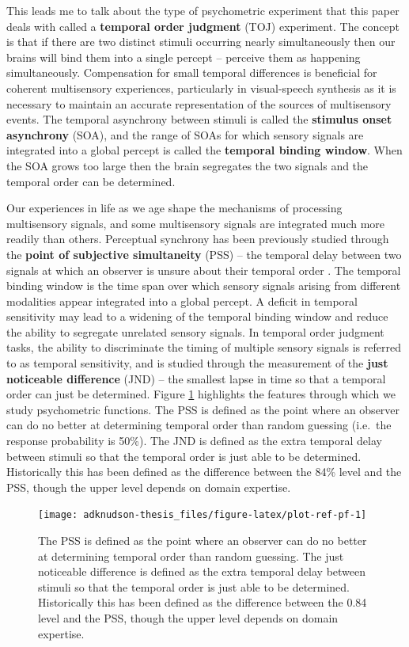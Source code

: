 \documentclass[
]{report}
\begin{document}
This leads me to talk about the type of psychometric experiment that this paper deals with called a \textbf{temporal order judgment} (TOJ) experiment. The concept is that if there are two distinct stimuli occurring nearly simultaneously then our brains will bind them into a single percept -- perceive them as happening simultaneously. Compensation for small temporal differences is beneficial for coherent multisensory experiences, particularly in visual-speech synthesis as it is necessary to maintain an accurate representation of the sources of multisensory events. The temporal asynchrony between stimuli is called the \textbf{stimulus onset asynchrony} (SOA), and the range of SOAs for which sensory signals are integrated into a global percept is called the \textbf{temporal binding window}. When the SOA grows too large then the brain segregates the two signals and the temporal order can be determined.

Our experiences in life as we age shape the mechanisms of processing multisensory signals, and some multisensory signals are integrated much more readily than others. Perceptual synchrony has been previously studied through the \textbf{point of subjective simultaneity} (PSS) -- the temporal delay between two signals at which an observer is unsure about their temporal order \citep{stone2001now}. The temporal binding window is the time span over which sensory signals arising from different modalities appear integrated into a global percept. A deficit in temporal sensitivity may lead to a widening of the temporal binding window and reduce the ability to segregate unrelated sensory signals. In temporal order judgment tasks, the ability to discriminate the timing of multiple sensory signals is referred to as temporal sensitivity, and is studied through the measurement of the \textbf{just noticeable difference} (JND) -- the smallest lapse in time so that a temporal order can just be determined. Figure \ref{fig:plot-ref-pf} highlights the features through which we study psychometric functions. The PSS is defined as the point where an observer can do no better at determining temporal order than random guessing (i.e.~the response probability is 50\%). The JND is defined as the extra temporal delay between stimuli so that the temporal order is just able to be determined. Historically this has been defined as the difference between the 84\% level and the PSS, though the upper level depends on domain expertise.

\begin{figure}

{\centering \texttt{[image: adknudson-thesis\_files/figure-latex/plot-ref-pf-1]} 

}

\caption{The PSS is defined as the point where an observer can do no better at determining temporal order than random guessing. The just noticeable difference is defined as the extra temporal delay between stimuli so that the temporal order is just able to be determined. Historically this has been defined as the difference between the 0.84 level and the PSS, though the upper level depends on domain expertise.}\label{fig:plot-ref-pf}
\end{figure}
\end{document}
